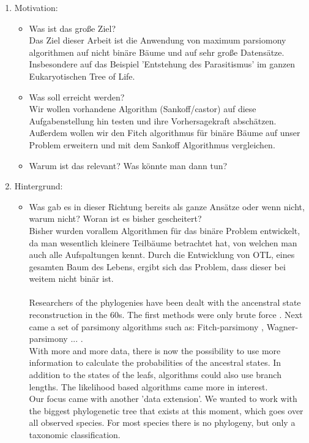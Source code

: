   \begin{enumerate}
    \item Motivation:
      \begin{itemize}
        \item Was ist das große Ziel? \\
          Das Ziel dieser Arbeit ist die Anwendung von maximum parsiomony algorithmen auf nicht 
          binäre Bäume und auf sehr große Datensätze. Insbesondere auf das Beispiel 'Entstehung des 
          Parasitismus' im ganzen Eukaryotischen Tree of Life.
        \item Was soll erreicht werden? \\
          Wir wollen vorhandene Algorithm (Sankoff/castor) auf diese Aufgabenstellung hin testen 
          und ihre Vorhersagekraft abschätzen. Außerdem wollen wir den Fitch algorithmus für binäre 
          Bäume auf unser Problem erweitern und mit dem Sankoff Algorithmus vergleichen.
        \item Warum ist das relevant? Was könnte man dann tun?\\
          \todo{!!!}
      \end{itemize}
    \item Hintergrund:
      \begin{itemize}
        \item Was gab es in dieser Richtung bereits als ganze Ansätze oder wenn nicht, warum nicht?
          Woran ist es bisher gescheitert? \\
          Bisher wurden vorallem Algorithmen für das binäre Problem entwickelt, da man wesentlich 
            kleinere Teilbäume betrachtet hat, von welchen man auch alle Aufspaltungen kennt. Durch 
            die Entwicklung von OTL, eines gesamten Baum des Lebens, ergibt sich das Problem, dass 
            dieser bei weitem nicht binär ist. \\ \\
  Researchers of the phylogenies have been dealt with the ancenstral state reconstruction in the 
    60s. The first methods were only brute force . 
    Next came a set of parsimony algorithms such as: Fitch-parsimony \cite{Fitch1971}, 
    Wagner-parsimony \cite{Swofford1987} ... . \\
    With more and more data, there is now the possibility to use more information to calculate the 
    probabilities of the ancestral states. In addition to the states of the leafs, algorithms could 
    also use branch lengths. The likelihood based algorithms came more in interest. \\
    Our focus came with another 'data extension'. We wanted to work with the biggest phylogenetic tree 
    that exists at this moment, which goes over all observed species. For most  species 
    there is no phylogeny, but only a taxonomic classification.
  

\end{itemize}
\end{enumerate}
